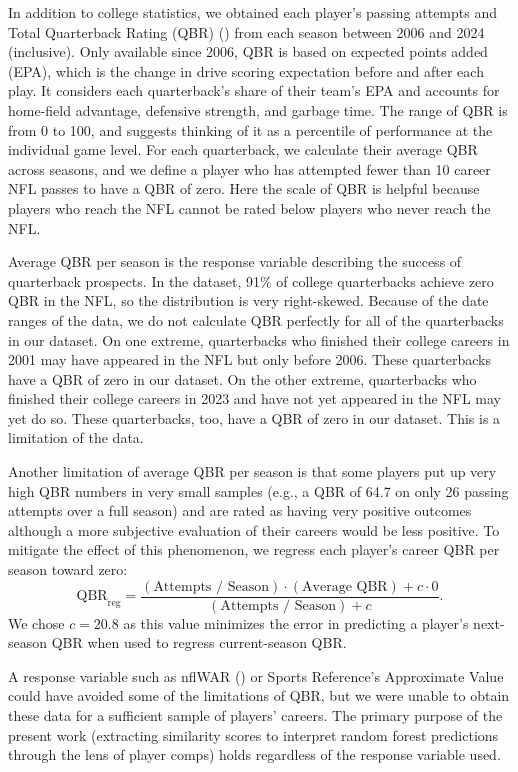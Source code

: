 \documentclass{article}
\begin{document}
In addition to college statistics, we obtained each player's passing attempts and Total Quarterback Rating (QBR) (\cite{burke_how_2016}) from each season between 2006 and 2024 (inclusive). Only available since 2006, QBR is based on expected points added (EPA), which is the change in drive scoring expectation before and after each play. It considers each quarterback's share of their team's EPA and accounts for home-field advantage, defensive strength, and garbage time. The range of QBR is from 0 to 100, and \textcite{burke_how_2016} suggests thinking of it as a percentile of performance at the individual game level. For each quarterback, we calculate their average QBR across seasons, and we define a player who has attempted fewer than 10 career NFL passes to have a QBR of zero. Here the scale of QBR is helpful because players who reach the NFL cannot be rated below players who never reach the NFL. 

Average QBR per season is the response variable describing the success of quarterback prospects. In the dataset, 91\% of college quarterbacks achieve zero QBR in the NFL, so the distribution is very right-skewed. Because of the date ranges of the data, we do not calculate QBR perfectly for all of the quarterbacks in our dataset. On one extreme, quarterbacks who finished their college careers in 2001 may have appeared in the NFL but only before 2006. These quarterbacks have a QBR of zero in our dataset. On the other extreme, quarterbacks who finished their college careers in 2023 and have not yet appeared in the NFL may yet do so. These quarterbacks, too, have a QBR of zero in our dataset. This is a limitation of the data.

Another limitation of average QBR per season is that some players put up very high QBR numbers in very small samples (e.g., a QBR of 64.7 on only 26 passing attempts over a full season) and are rated as having very positive outcomes although a more subjective evaluation of their careers would be less positive. To mitigate the effect of this phenomenon, we regress each player's career QBR per season toward zero:
\begin{equation*}
  \mbox{QBR}_{\mbox{reg}} = \frac{(\mbox{Attempts / Season}) \cdot (\mbox{Average QBR}) + c \cdot 0}{(\mbox{Attempts / Season}) + c}.
\end{equation*}
We chose $c = 20.8$ as this value minimizes the error in predicting a player's next-season QBR when used to regress current-season QBR.

A response variable such as nflWAR (\cite{yurko_nflwar_2019}) or Sports Reference's Approximate Value could have avoided some of the limitations of QBR, but we were unable to obtain these data for a sufficient sample of players' careers. The primary purpose of the present work (extracting similarity scores to interpret random forest predictions through the lens of player comps) holds regardless of the response variable used.
\end{document}
